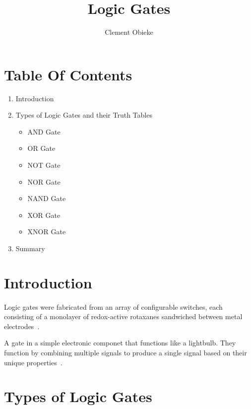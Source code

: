 \documentclass{article}
\begin{document}
	\title{Logic Gates}
	\author{Clement Obieke}

	
	
\maketitle
\newpage
\centering
\section*{Table Of Contents}
	
	\begin{enumerate}
		\item Introduction
		\item Types of Logic Gates and their Truth Tables
		\begin{itemize}
			\item AND Gate
			\item OR Gate
			\item NOT Gate
			\item NOR Gate
			\item NAND Gate
			\item XOR Gate
			\item XNOR Gate
		\end{itemize}
			\item Summary		
	\end{enumerate}
	
	
\newpage
\section{Introduction}
	\raggedright
	\paragraph{}
	Logic gates were fabricated from an array of configurable switches, each consisting of a monolayer of redox-active rotaxanes sandwiched between metal electrodes~\cite{collier1999electronically}.  
	
	A gate in a simple electronic componet that functions like a lightbulb.
	They function by combining multiple signals to produce a single signal 
	based on their unique properties~\cite{okoacha2021logicgatesintro}.
	
\section{Types of Logic Gates}
\end{document}
